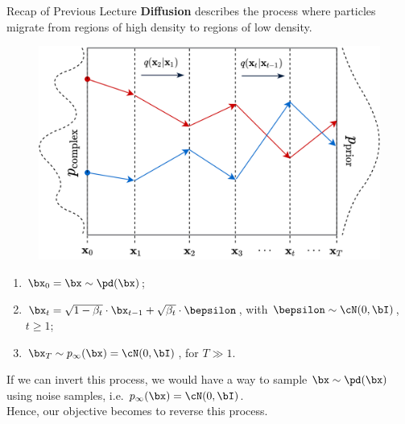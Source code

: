 \documentclass{beamer}
\begin{document}
\begin{frame}{Recap of Previous Lecture}
    \textbf{Diffusion} describes the process where particles migrate from regions of high density to regions of low density.
    \vspace{-0.2cm}
    \begin{figure}
        \includegraphics[width=0.5\linewidth]{figs/diffusion_over_time}
    \end{figure}
    \vspace{-0.6cm}
    \begin{enumerate}
        \item $\bx_0 = \bx \sim \pd(\bx)$;
        \item $\bx_t = \sqrt{1 - \beta_t} \cdot \bx_{t - 1} + \sqrt{\beta_t} \cdot \bepsilon$, with $\bepsilon \sim \cN(0, \bI)$, $t \geq 1$;
        \item $\bx_T \sim p_{\infty}(\bx) = \cN(0, \bI)$, for $T \gg 1$.
    \end{enumerate}
    If we can invert this process, we would have a way to sample $\bx \sim \pd(\bx)$ using noise samples, i.e. $p_{\infty}(\bx) = \cN(0, \bI)$. \\ 
    Hence, our objective becomes to reverse this process.
\end{frame}
\end{document}

